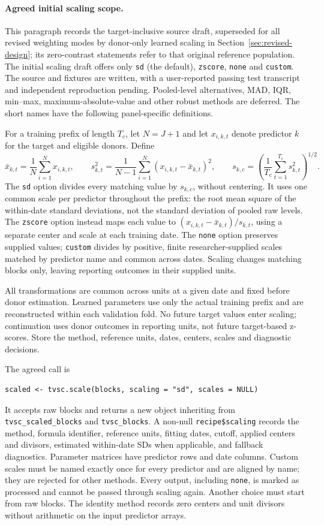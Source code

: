\documentclass[11pt]{article}
\begin{document}
\paragraph{Agreed initial scaling scope.}
This paragraph records the target-inclusive source draft, superseded for
all revised weighting modes by donor-only learned scaling in
Section~\ref{sec:revised-design}; its zero-contrast statements refer to
that original reference population.
The initial scaling draft offers only \texttt{sd} (the default),
\texttt{zscore}, \texttt{none} and \texttt{custom}. The source and fixtures
are written, with a user-reported passing test transcript and independent
reproduction pending. Pooled-level alternatives,
MAD, IQR, min--max, maximum-absolute-value and other robust methods are
deferred. The short names have the following panel-specific definitions.

For a training prefix of length $T_c$, let $N=J+1$ and let $x_{i,k,t}$
denote predictor $k$ for the target and eligible donors. Define
\[
 \bar x_{k,t}=\frac1N\sum_{i=1}^N x_{i,k,t},\qquad
 s_{k,t}^2=\frac1{N-1}\sum_{i=1}^N(x_{i,k,t}-\bar x_{k,t})^2,
 \qquad s_{k,c}=\left(\frac1{T_c}\sum_{t=1}^{T_c}s_{k,t}^2\right)^{1/2}.
\]
The \texttt{sd} option divides every matching value by $s_{k,c}$,
without centering. It uses one common scale per predictor throughout
the prefix: the root mean square of the within-date standard deviations,
not the standard deviation of pooled raw levels. The \texttt{zscore}
option instead maps each value to $(x_{i,k,t}-\bar x_{k,t})/s_{k,t}$,
using a separate center and scale at each training date. The \texttt{none}
option preserves supplied values; \texttt{custom} divides by positive,
finite researcher-supplied scales matched by predictor name and common
across dates. Scaling changes matching blocks only, leaving reporting
outcomes in their supplied units.

All transformations are common across units at a given date and fixed
before donor estimation. Learned parameters use only the actual training
prefix and are reconstructed within each validation fold. No future target
values enter scaling; continuation uses donor outcomes in reporting units,
not future target-based z-scores. Store the method, reference units, dates,
centers, scales and diagnostic decisions.

The agreed call is
\begin{verbatim}
scaled <- tvsc.scale(blocks, scaling = "sd", scales = NULL)
\end{verbatim}
It accepts raw blocks and returns a new object inheriting from
\texttt{tvsc\_scaled\_blocks} and \texttt{tvsc\_blocks}. A non-null
\texttt{recipe\$scaling} records the method, formula identifier, reference
units, fitting dates, cutoff, applied centers and divisors, estimated
within-date SDs when applicable, and fallback diagnostics. Parameter
matrices have predictor rows and date columns. Custom scales must be named
exactly once for every predictor and are aligned by name; they are rejected
for other methods. Every output, including \texttt{none}, is marked as
processed and cannot be passed through scaling again. Another choice must
start from raw blocks. The identity method records zero centers and unit
divisors without arithmetic on the input predictor arrays.
\end{document}
